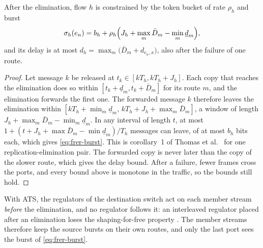 \begin{proposition}
\label{prop:frer}
After the elimination, flow $h$ is constrained by the token bucket of rate
$\rho_h$ and burst
\begin{equation}
\sigma_h(e_n)=b_h+\rho_h\Bigl(J_h+\max_m\bar D_m-\min_m\underline{d}_m\Bigr),
\label{eq:frer-burst}
\end{equation}
and its delay is at most $d_h=\max_m\bigl(\bar D_m+d_{e_n,x}\bigr)$, also
after the failure of one route.
\end{proposition}
\begin{proof}
Let message $k$ be released at $t_k\in[kT_h,kT_h+J_h]$. Each copy that
reaches the elimination does so within $[t_k+\underline{d}_m,t_k+\bar
D_m]$ for its route $m$, and the elimination forwards the first one. The
forwarded message $k$ therefore leaves the elimination within
$[kT_h+\min_m\underline{d}_m,\,kT_h+J_h+\max_m\bar D_m]$, a window of length
$J_h+\max_m\bar D_m-\min_m\underline{d}_m$. In any interval of length $t$,
at most $1+(t+J_h+\max\bar D_m-\min\underline{d}_m)/T_h$ messages can leave,
of at most $b_h$ bits each, which gives \cref{eq:frer-burst}. This is
corollary~1 of Thomas et al.\ \cite{thomas2022worst} for one
replication-elimination pair. The forwarded copy is never later than the
copy of the slower route, which gives the delay bound. After a failure,
fewer frames cross the ports, and every bound above is monotone in the
traffic, so the bounds still hold.
\end{proof}
With ATS, the regulators of the destination switch act on each member
stream \emph{before} the elimination, and no regulator follows it: an
interleaved regulator placed after an elimination loses the
shaping-for-free property \cite{thomas2022worst}. The member streams
therefore keep the source bursts on their own routes, and only the last
port sees the burst of \cref{eq:frer-burst}.

